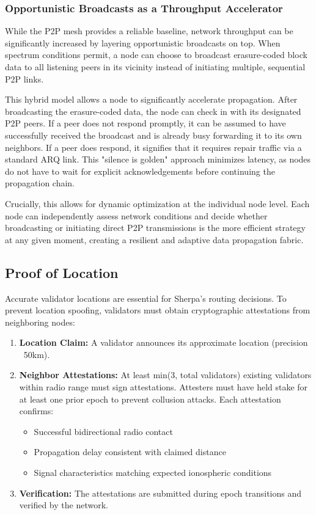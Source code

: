 \documentclass{article}
\begin{document}
\subsubsection{Opportunistic Broadcasts as a Throughput Accelerator}
\label{sec:opportunistic_broadcasts}

While the P2P mesh provides a reliable baseline, network throughput can be significantly increased by layering opportunistic broadcasts on top. When spectrum conditions permit, a node can choose to broadcast erasure-coded block data to all listening peers in its vicinity instead of initiating multiple, sequential P2P links.

This hybrid model allows a node to significantly accelerate propagation. After broadcasting the erasure-coded data, the node can check in with its designated P2P peers. If a peer does not respond promptly, it can be assumed to have successfully received the broadcast and is already busy forwarding it to its own neighbors. If a peer does respond, it signifies that it requires repair traffic via a standard ARQ link. This "silence is golden" approach minimizes latency, as nodes do not have to wait for explicit acknowledgements before continuing the propagation chain.

Crucially, this allows for dynamic optimization at the individual node level. Each node can independently assess network conditions and decide whether broadcasting or initiating direct P2P transmissions is the more efficient strategy at any given moment, creating a resilient and adaptive data propagation fabric.

\subsection{Proof of Location}
\label{sec:proof_of_location}

Accurate validator locations are essential for Sherpa's routing decisions. To prevent location spoofing, validators must obtain cryptographic attestations from neighboring nodes:

\begin{enumerate}
    \item \textbf{Location Claim:} A validator announces its approximate location (precision ~50km).
    \item \textbf{Neighbor Attestations:} At least min(3, total validators) existing validators within radio range must sign attestations. Attesters must have held stake for at least one prior epoch to prevent collusion attacks. Each attestation confirms:
        \begin{itemize}
            \item Successful bidirectional radio contact
            \item Propagation delay consistent with claimed distance
            \item Signal characteristics matching expected ionospheric conditions
        \end{itemize}
    \item \textbf{Verification:} The attestations are submitted during epoch transitions and verified by the network.
\end{enumerate}
\end{document}

